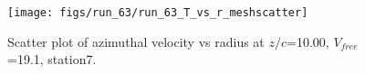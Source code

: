 \begin{figure}[H]
\centering
\texttt{[image: figs/run\_63/run\_63\_T\_vs\_r\_meshscatter]}
\caption{Scatter plot of azimuthal velocity vs radius at $z/c$=10.00, $V_{free}$=19.1, station7.}
\end{figure}


